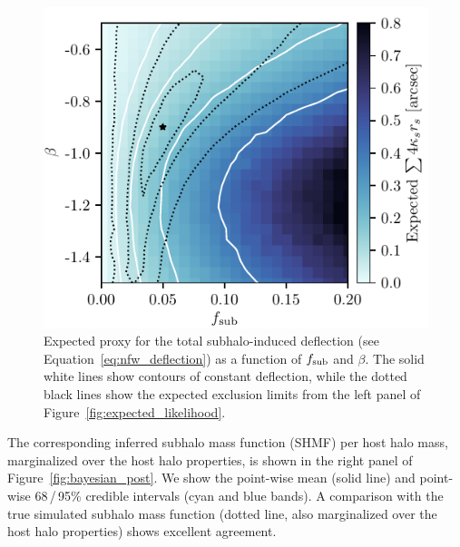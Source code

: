 \documentclass[twocolumn]{aastex63}
\begin{document}
\begin{figure}
\centering
\includegraphics[height=0.4\textwidth]{figures/warum_ist_die_banane_krumm}  %
\caption{Expected proxy for the total subhalo-induced deflection (see Equation~\eqref{eq:nfw_deflection}) as a function of $f_{\mathrm{sub}}$ and $\beta$. The solid white lines show contours of constant deflection, while the dotted black lines show the expected exclusion limits from the left panel of Figure~\ref{fig:expected_likelihood}. }
\label{fig:banana}
\end{figure}

The corresponding inferred subhalo mass function (SHMF) per host halo mass, marginalized over the host halo properties, is shown in the right panel of Figure~\ref{fig:bayesian_post}. We show the point-wise mean (solid line) and point-wise 68\,/\,95\% credible intervals (cyan and blue bands). A comparison with the true simulated subhalo mass function (dotted line, also marginalized over the host halo properties) shows excellent agreement.
\end{document}
